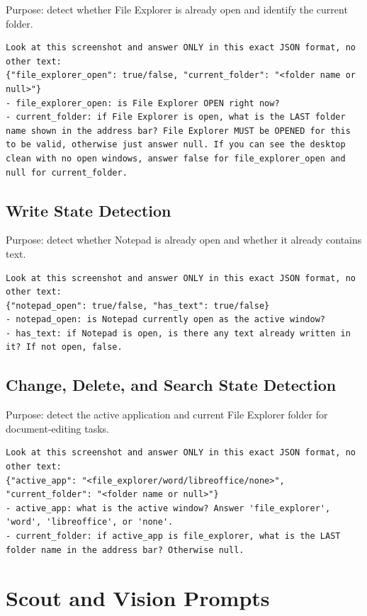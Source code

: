 Purpose: detect whether File Explorer is already open and identify the current folder.

\begin{lstlisting}
Look at this screenshot and answer ONLY in this exact JSON format, no other text:
{"file_explorer_open": true/false, "current_folder": "<folder name or null>"}
- file_explorer_open: is File Explorer OPEN right now?
- current_folder: if File Explorer is open, what is the LAST folder name shown in the address bar? File Explorer MUST be OPENED for this to be valid, otherwise just answer null. If you can see the desktop clean with no open windows, answer false for file_explorer_open and null for current_folder.
\end{lstlisting}

\subsection{Write State Detection}

Purpose: detect whether Notepad is already open and whether it already contains text.

\begin{lstlisting}
Look at this screenshot and answer ONLY in this exact JSON format, no other text:
{"notepad_open": true/false, "has_text": true/false}
- notepad_open: is Notepad currently open as the active window?
- has_text: if Notepad is open, is there any text already written in it? If not open, false.
\end{lstlisting}

\subsection{Change, Delete, and Search State Detection}

Purpose: detect the active application and current File Explorer folder for document-editing tasks.

\begin{lstlisting}
Look at this screenshot and answer ONLY in this exact JSON format, no other text:
{"active_app": "<file_explorer/word/libreoffice/none>", "current_folder": "<folder name or null>"}
- active_app: what is the active window? Answer 'file_explorer', 'word', 'libreoffice', or 'none'.
- current_folder: if active_app is file_explorer, what is the LAST folder name in the address bar? Otherwise null.
\end{lstlisting}

\section{Scout and Vision Prompts}

